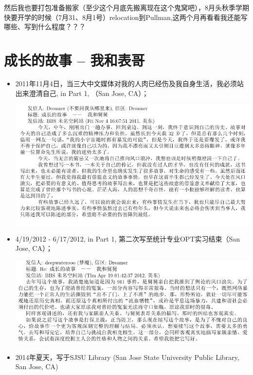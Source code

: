 \documentclass[9pt, b5paper]{article}
\begin{document}
然后我也要打包准备搬家（至少这个月底先搬离现在这个鬼窝吧），8月头秋季学期快要开学的时候（7月31、8月1号）relocation到Pullman,这两个月再看看我还能写哪些、写到什么程度？？？

\section{成长的故事 -- 我和表哥}
\label{sec:org4e40c5c}
\begin{itemize}
\item 2011年11月4日，当三大中文媒体对我的人肉已经伤及我自身生活，我必须站出来澄清自己, in Part 1, （San Jose, CA）；

\begin{center}
\includegraphics[width=.9\linewidth]{./pic/dreamer1.png}
\end{center}
\item 4/19/2012 - 6/17/2012, in Part 1, 第二次写至统计专业OPT实习结束（San Jose, CA）；

\begin{center}
\includegraphics[width=.9\linewidth]{./pic/dreamer2.png}
\end{center}
\item 2014年夏天，写于SJSU Library (San Jose State University Public Library, San Jose, CA)


\end{itemize}
\end{document}
